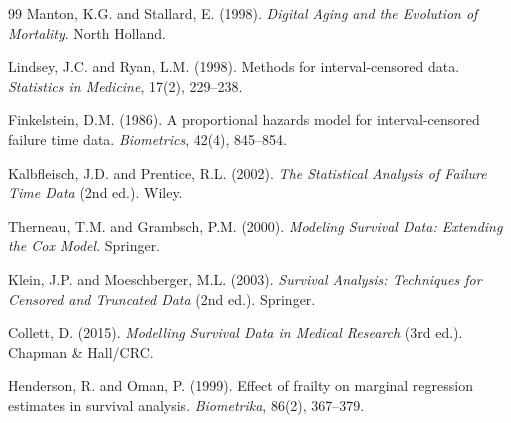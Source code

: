 \documentclass[12pt,a4paper]{article}
\begin{document}
\begin{thebibliography}{99}
Manton, K.G. and Stallard, E. (1998). \emph{Digital Aging and the Evolution of Mortality}. North Holland.

Lindsey, J.C. and Ryan, L.M. (1998). Methods for interval-censored data. \emph{Statistics in Medicine}, 17(2), 229--238.

Finkelstein, D.M. (1986). A proportional hazards model for interval-censored failure time data. \emph{Biometrics}, 42(4), 845--854.

Kalbfleisch, J.D. and Prentice, R.L. (2002). \emph{The Statistical Analysis of Failure Time Data} (2nd ed.). Wiley.

Therneau, T.M. and Grambsch, P.M. (2000). \emph{Modeling Survival Data: Extending the Cox Model}. Springer.

Klein, J.P. and Moeschberger, M.L. (2003). \emph{Survival Analysis: Techniques for Censored and Truncated Data} (2nd ed.). Springer.

Collett, D. (2015). \emph{Modelling Survival Data in Medical Research} (3rd ed.). Chapman \& Hall/CRC.

Henderson, R. and Oman, P. (1999). Effect of frailty on marginal regression estimates in survival analysis. \emph{Biometrika}, 86(2), 367--379.

\end{thebibliography}
\end{document}
